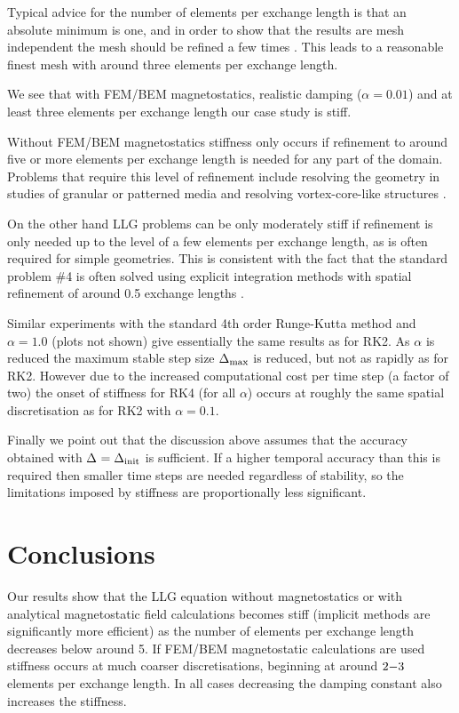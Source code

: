 Typical advice for the number of elements per exchange length is that an absolute minimum is one, and in order to show that the results are mesh independent the mesh should be refined a few times \cite[Sec. 11]{nmag-manual}.
This leads to a reasonable finest mesh with around three elements per exchange length.

We see that with FEM/BEM magnetostatics, realistic damping ($\alpha = 0.01$) and at least three elements per exchange length our case study is stiff.

Without FEM/BEM magnetostatics stiffness only occurs if refinement to around five or more elements per exchange length is needed for any part of the domain.
Problems that require this level of refinement include resolving the geometry in studies of granular or patterned media \cite{Suess2002} and resolving vortex-core-like structures \cite{Andreas2014}.

On the other hand LLG problems can be only moderately stiff if refinement is only needed up to the level of a few elements per exchange length, as is often required for simple geometries.
This is consistent with the fact that the \mumag standard problem \#4 is often solved using explicit integration methods with spatial refinement of around 0.5 exchange lengths \cite{mumag-website}.

Similar experiments with the standard 4th order Runge-Kutta method \cite[41]{Iserles2009} and $\alpha=1.0$ (plots not shown) give essentially the same results as for RK2. As $\alpha$ is reduced the maximum stable step size $\Delta_{\mathrm{max}}$ is reduced, but not as rapidly as for RK2. However due to the increased computational cost per time step (a factor of two) the onset of stiffness for RK4 (for all $\alpha$) occurs at roughly the same spatial discretisation as for RK2 with $\alpha = 0.1$.

Finally we point out that the discussion above assumes that the accuracy obtained with $\Delta_{} = \Delta_{\mathrm{init}}$ is sufficient.
If a higher temporal accuracy than this is required then smaller time steps are needed regardless of stability, so the limitations imposed by stiffness are proportionally less significant.


\section{Conclusions}
Our results show that the LLG equation without magnetostatics or with analytical magnetostatic field calculations becomes stiff (\ie implicit methods are significantly more efficient) as the number of elements per exchange length decreases below around 5.
If FEM/BEM magnetostatic calculations are used stiffness occurs at much coarser discretisations, beginning at around $2\mathrm{-} 3$ elements per exchange length.
In all cases decreasing the damping constant also increases the stiffness.


